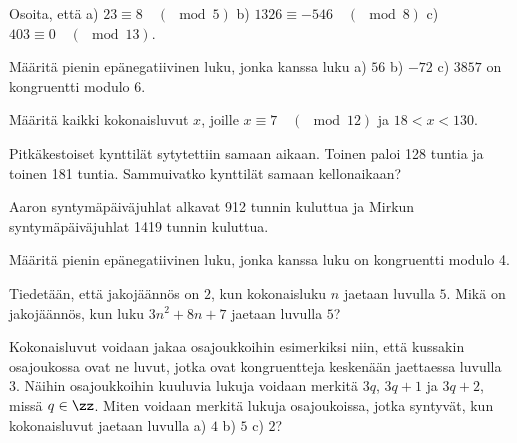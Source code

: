 \begin{tehtavasivu}

\begin{tehtava}
	Osoita, että a) $23 \equiv 8 \quad (\mod 5)$ b) $1326 \equiv -546\quad (\mod 8)$ c) $403 \equiv 0 \quad (\mod 13)$.
\end{tehtava}

\begin{tehtava}
	Määritä pienin epänegatiivinen luku, jonka kanssa luku a) $56$ b) $-72$ c) $3857$ on kongruentti modulo $6$.
\end{tehtava}

\begin{tehtava}
	Määritä kaikki kokonaisluvut $x$, joille $x \equiv 7 \quad (\mod 12)$ ja $18 < x < 130$.
\end{tehtava}

\begin{tehtava}
	Pitkäkestoiset kynttilät sytytettiin samaan aikaan. Toinen paloi 128 tuntia ja toinen 181 tuntia. Sammuivatko kynttilät samaan kellonaikaan?
\end{tehtava}

\begin{tehtava}
	Aaron syntymäpäiväjuhlat alkavat 912 tunnin kuluttua ja Mirkun syntymäpäiväjuhlat 1419 tunnin kuluttua.
\end{tehtava}

\begin{tehtava}
	Määritä pienin epänegatiivinen luku, jonka kanssa luku
	on kongruentti modulo 4.
\end{tehtava}

\begin{tehtava}
	Tiedetään, että jakojäännös on $2$, kun kokonaisluku $n$ jaetaan luvulla $5$. Mikä on jakojäännös, kun luku $3n^2 + 8n + 7$ jaetaan luvulla $5$?
\end{tehtava}

\begin{tehtava}
	Kokonaisluvut voidaan jakaa osajoukkoihin esimerkiksi niin, että kussakin osajoukossa ovat ne luvut, jotka ovat kongruentteja keskenään jaettaessa luvulla 3. Näihin osajoukkoihin kuuluvia lukuja voidaan merkitä $3q$, $3q + 1$ ja $3q + 2$, missä $q \in \zz$. Miten voidaan merkitä lukuja osajoukoissa, jotka syntyvät, kun kokonaisluvut jaetaan luvulla a) $4$ b) $5$ c) $2$?
\end{tehtava}


\end{tehtavasivu}
